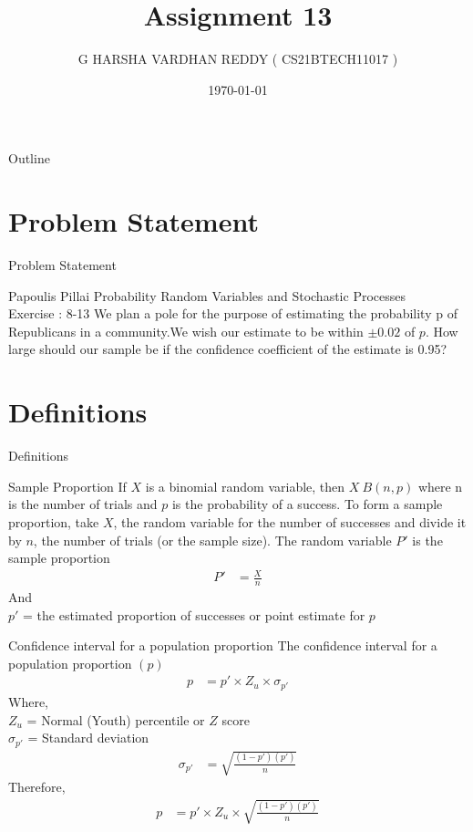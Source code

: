\documentclass{beamer}
\title{Assignment 13}
\author[CS21BTECH11017]{G HARSHA VARDHAN REDDY ( CS21BTECH11017 )}
\date{\today}
\begin{document}
\begin{frame}
    \titlepage 
\end{frame}

\logo{}


\begin{frame}{Outline}
    \tableofcontents
\end{frame}

\section{Problem Statement}
\begin{frame}{Problem Statement}
    \begin{block} {Papoulis Pillai Probability Random Variables and Stochastic Processes\\ 
    Exercise : 8-13}
    We plan a pole for the purpose of estimating the probability p of Republicans in a community.We wish our estimate to be within $\pm 0.02$ of  $p$. How large should our sample be if the confidence coefficient of the estimate is 0.95?
    \end{block}
\end{frame}
\section{Definitions}
\begin{frame}{Definitions}
    \begin{block}{Sample Proportion}
     If $X$ is a binomial random variable, then $X ~ B(n, p)$ where n is the number of trials and $p$ is the probability of a success. To form a sample proportion, take $X$, the random variable for the number of successes and divide it by $n$, the number of trials (or the sample size). The random variable $P'$ is the sample proportion
     \begin{align}
         P' &= \frac{X}{n} 
     \end{align}
And \\
    $p'$ =  the estimated proportion of successes or point estimate for $p$
    \end{block}
\end{frame}
\begin{frame}{}
     \begin{block}{Confidence interval for a population proportion}
        The confidence interval for a population proportion $(p)$
        \begin{align}
            p &= p'\times Z_u\times \sigma_{p'}
        \end{align}
    Where,\\
        $Z_u$ = Normal (Youth) percentile or $Z$ score\\
        $\sigma_{p'} $ = Standard deviation
        \begin{align}
            \sigma_{p'} &= \sqrt{\frac{(1-p')(p')}{n}}
        \end{align}
    Therefore,
        \begin{align}
            p &= p'\times Z_u \times \sqrt{\frac{(1-p')(p')}{n}}\label{4}
        \end{align}
    \end{block}
\end{frame}
\end{document}
